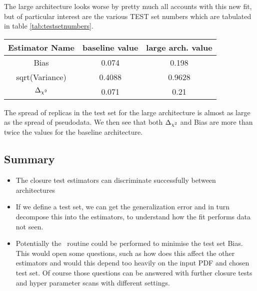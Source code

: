 The large architecture looks worse by pretty much all accounts
with this new fit, but of particular interest are the various TEST set numbers
which are tabulated in table \ref{tab:testsetnumbers}.

\begin{center}
    \begin{tabular}{ |c|c|c| }
        \hline
        Estimator Name & baseline value & large arch. value \\
        \hline\hline
        Bias & 0.074& 0.198\\
        sqrt(Variance) & 0.4088 & 0.9628\\
        $\Delta_{\chi^{2}}$ & 0.071& 0.21\\
        \hline
   \end{tabular}\label{tab:testsetnumbers}
\end{center}

The spread of replicas in the test set for the large architecture is almost
as large as the spread of pseudodata. We then see that both $\Delta_{\chi^{2}}$ and Bias are
more than twice the values for the baseline architecture.

\subsection{Summary}

\begin{itemize}
    \item The closure test estimators can discriminate successfully between architectures
    \item If we define a test set, we can get the generalization error and in
        turn decompose this into the estimators, to understand how the fit
        performs data not seen.
    \item Potentially the \hyperopt\ routine could be performed to minimise the
        test set Bias. This would open some questions, such as how does this
        affect the other estimators and would this depend too heavily on the input
        PDF and chosen test set. Of course those questions can be answered with
        further closure tests and hyper parameter scans with different settings.
\end{itemize}
